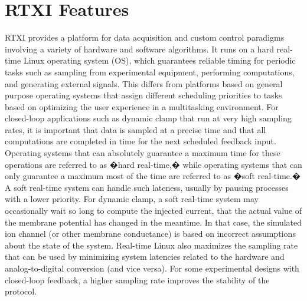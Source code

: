 \chapter{RTXI Features}

 RTXI provides a platform for data acquisition and custom control paradigms involving a variety of hardware and software algorithms. It runs on a hard real-time Linux operating system (OS), which guarantees reliable timing for periodic tasks such as sampling from experimental equipment, performing computations, and generating external signals. This differs from platforms based on general purpose operating systems that assign different scheduling priorities to tasks based on optimizing the user experience in a multitasking environment. For closed-loop applications such as dynamic clamp that run at very high sampling rates, it is important that data is sampled at a precise time and that all computations are completed in time for the next scheduled feedback input. Operating systems that can absolutely guarantee a maximum time for these operations are referred to as �hard real-time,� while operating systems that can only guarantee a maximum most of the time are referred to as �soft real-time.� A soft real-time system can handle such lateness, usually by pausing processes with a lower priority. For dynamic clamp, a soft real-time system may occasionally wait so long to compute the injected current, that the actual value of the membrane potential has changed in the meantime. In that case, the simulated ion channel (or other membrane conductance) is based on incorrect assumptions about the state of the system. Real-time Linux also maximizes the sampling rate that can be used by minimizing system latencies related to the hardware and analog-to-digital conversion (and vice versa). For some experimental designs with closed-loop feedback, a higher sampling rate improves the stability of the protocol.

